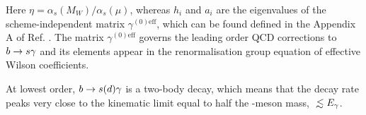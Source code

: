 Here $\eta=\alpha_s(M_W)/\alpha_s(\mu)$, whereas $h_i$ and $a_i$ are the eigenvalues of the scheme-independent matrix $\gamma^{(0)\mathrm{eff}}$, which can be found defined in the Appendix A of Ref. \cite{Buras:1993xp}.
The matrix $\gamma^{(0)\mathrm{eff}}$ governs the leading order QCD corrections to $b\rightarrow s\gamma$ and its elements appear in the renormalisation group equation of effective Wilson coefficients.




At lowest order, $b\rightarrow s(d) \gamma$ is a two-body decay, which means that the decay rate peaks very close to the kinematic limit equal to half the \B-meson mass, $\lsim E_{\g}$.
